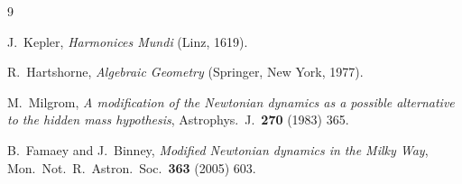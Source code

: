 \documentclass[twocolumn]{iopjournal}
\theoremstyle{definition}
\begin{document}
\begin{thebibliography}{9}

J.~Kepler,
\textit{Harmonices Mundi}
(Linz, 1619).

R.~Hartshorne,
\textit{Algebraic Geometry}
(Springer, New York, 1977).

M.~Milgrom,
\textit{A modification of the Newtonian dynamics as a possible
alternative to the hidden mass hypothesis},
Astrophys.\ J.\ \textbf{270} (1983) 365.

B.~Famaey and J.~Binney,
\textit{Modified Newtonian dynamics in the Milky Way},
Mon.\ Not.\ R.\ Astron.\ Soc.\ \textbf{363} (2005) 603.

\end{thebibliography}
\end{document}
